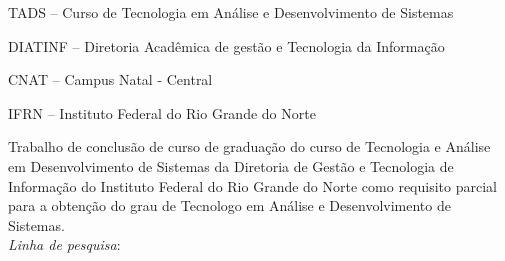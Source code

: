 
\titulo{\Large{\myThesis}}
\autor{\myName}
\orientador[Orientador]{\par \mySupervisorName}
\instituicao
{
   TADS -- Curso de Tecnologia em Análise e Desenvolvimento de
   Sistemas\par 
   DIATINF -- Diretoria Acadêmica de gestão e Tecnologia da Informação\par 
   CNAT -- Campus Natal - Central\par 
   IFRN -- Instituto Federal do Rio Grande do Norte }
	
\comentario
{
	Trabalho de conclusão de curso de graduação do curso de Tecnologia e Análise em
	Desenvolvimento de Sistemas da Diretoria de Gestão e Tecnologia de Informação
	do Instituto Federal do Rio Grande do Norte como requisito parcial para a
	obtenção do grau de Tecnologo em Análise e Desenvolvimento de
	Sistemas.\bigskip\\
   \textit{Linha de pesquisa}:\\\myLineOfResearch
}
		
\data{\myDeriveryDate}
	
\folhaderosto